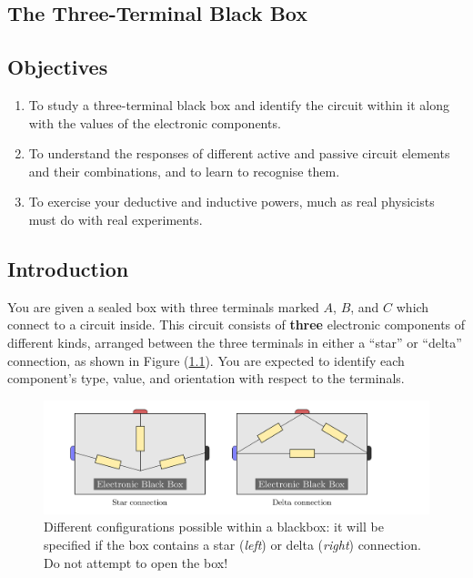 \begin{refsection}
\chapter{The Three-Terminal Black Box}

\section*{Objectives}

\begin{enumerate}
\item To study a three-terminal black box and identify the circuit within it along with the values of the electronic components.

\item To understand the responses of different active and passive circuit elements and their combinations, and to learn to recognise them.

\item To exercise your deductive and inductive powers, much as real physicists must do with real experiments.
\end{enumerate}


\section*{Introduction}

You are given a sealed box with three terminals marked $A$, $B$, and $C$ which connect to a circuit inside. This circuit consists of \textbf{three} electronic components of different kinds, arranged between the three terminals in either a ``star'' or ``delta'' connection, as shown in Figure (\ref{fig:bb}). You are expected to identify each component's type, value, and orientation with respect to the terminals. 

\begin{figure}[!htb]
    \centering
    \includegraphics[scale=0.3]{figs/bb.png}
    \caption{Different configurations possible within a blackbox: it will be specified if the box contains a star (\textit{left}) or delta (\textit{right}) connection. Do not attempt to open the box! }
    \label{fig:bb}
\end{figure}


\end{refsection}
